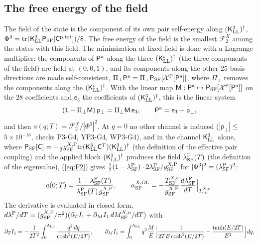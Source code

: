 \documentclass[aps,prd,onecolumn,superscriptaddress,nofootinbib,floatfix,longbibliography]{revtex4-2}
\newcommand{\LL}{{\rm LL}}
\newcommand{\SF}{{\rm SF}}
\newcommand{\tr}{\mathrm{tr}}
\begin{document}
\subsection{The free energy of the field}

The field of the state is the component of its own pair self-energy along $(\mathsf K^3_\LL)^\dagger$,
$\Phi^3=\tr(\mathsf K^3_\LL\mathsf P_\SF[\mathsf C^{\rm p,tot}])/8$. The free energy of the field is the smallest $\mathcal F^X_2$ among the states with
this field. The minimization at fixed field is done with a Lagrange multiplier: the components of $\mathsf P^{\rm a}$ along the three
$(\mathsf K^\iota_\LL)^\dagger$ (the three components of the field) are held at $(0,0,1)$, and its components along the other 25 basis
directions are made self-consistent, $\Pi_\perp\mathsf P^{\rm a}=\Pi_\perp\mathsf P_\SF[\mathcal X^{\rm P}[\mathsf P^{\rm a}]]$, where $\Pi_\perp$ removes the components
along the $(\mathsf K^\iota_\LL)^\dagger$. With the linear map $\mathsf M:\mathsf P^{\rm a}\mapsto\mathsf P_\SF[\mathcal X^{\rm P}[\mathsf P^{\rm a}]]$ on the 28 coefficients and
$\mathsf e_3$ the coefficients of $(\mathsf K^3_\LL)^\dagger$, this is the linear system
\begin{equation}
(\mathsf 1-\Pi_\perp\mathsf M)\,\mathsf p_\perp=\Pi_\perp\mathsf M\,\mathsf e_3,\qquad\mathsf P^{\rm a}=\mathsf e_3+\mathsf p_\perp ,
\label{eq:linsys}
\end{equation}
and then $a(q;T)=\mathcal F^X_2/|\Phi^3|^2$. At $q=0$ no other channel is induced ($|\mathsf p_\perp|\le${} $5\times10^{-16}$, checks P3-G4, YP3-G4, WP3-G4), and in the
channel $\mathsf K^3_\LL$ alone, where $\mathsf P_\SF[\mathsf C]=-\frac12g^{X,{\rm P}}_\SF\tr(\mathsf K^3_\LL\mathsf C^T)(\mathsf K^3_\LL)^\dagger$ (the definition of the effective
pair coupling) and the applied block $(\mathsf K^3_\LL)^\dagger$ produces the field $\lambda^{\rm P}_\SF(T)$ (the definition of the eigenvalue),
(\ref{eq:F2}) gives $\frac12(1-\lambda^{\rm P}_\SF)\cdot2\lambda^{\rm P}_\SF/g^{X,{\rm P}}_\SF$ for $|\Phi^3|^2=(\lambda^{\rm P}_\SF)^2$:
\begin{equation}
a(0;T)=\frac{1-\lambda^{\rm P}_\SF(T)}{\lambda^{\rm P}_\SF(T)\,g^{X,{\rm P}}_\SF},\qquad\alpha^{X,{\rm GL}}_\SF=-\frac{T^{X,{\rm c}}_\SF}{g^{X,{\rm P}}_\SF}\frac{d\lambda^{\rm P}_\SF}{dT}\Big|_{T^{X,{\rm c}}_\SF}.
\label{eq:a0}
\end{equation}
The derivative is evaluated in closed form, $d\lambda^{\rm P}/dT=(g^{X,{\rm P}}_\SF/\pi^2)(\partial_TI_1+\partial_MI_1\,dM^{X,{\rm n}}_\SF/dT)$ with
\begin{equation}
\partial_TI_1=-\frac1{2T^2}\int_0^{\Lambda_\LL}\frac{q^2\,dq}{\cosh^2(E/2T)},\qquad\partial_MI_1=\int_0^{\Lambda_\LL}q^2\frac{M}{E}\Big[\frac1{2TE\cosh^2(E/2T)}-\frac{\tanh(E/2T)}{E^2}\Big]dq,
\label{eq:dI}
\end{equation}
\end{document}

